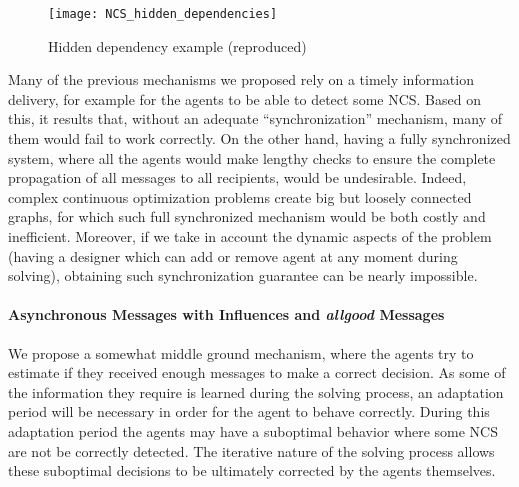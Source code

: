 \begin{figure}
\centering
\texttt{[image: NCS\_hidden\_dependencies]}
\caption{Hidden dependency example (reproduced)}\label{NCS_async_requests}
\end{figure}

Many of the previous mechanisms we proposed rely on a timely information delivery, for example for the agents to be able to detect some NCS. Based on this, it results that, without an adequate \enquote{synchronization} mechanism, many of them would fail to work correctly. On the other hand, having a fully synchronized system, where all the agents would make lengthy checks to ensure the complete propagation of all messages to all recipients, would be undesirable. Indeed, complex continuous optimization problems create big but loosely connected graphs, for which such full synchronized mechanism would be both costly and inefficient. Moreover, if we take in account the dynamic aspects of the problem (having a designer which can add or remove agent at any moment during solving), obtaining such synchronization guarantee can be nearly impossible.

\paragraph*{Asynchronous Messages with Influences and \emph{allgood} Messages}
We propose a somewhat middle ground mechanism, where the agents try to estimate if they received enough messages to make a correct decision. As some of the information they require is learned during the solving process, an adaptation period will be necessary in order for the agent to behave correctly. During this adaptation period the agents may have a suboptimal behavior where some NCS are not be correctly detected. The iterative nature of the solving process allows these suboptimal decisions to be ultimately corrected by the agents themselves.

